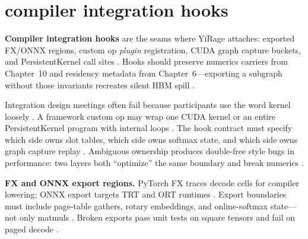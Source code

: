 \section{compiler integration hooks}
\label{sec:ch28_compiler_integration_hooks}

\textbf{Compiler integration hooks} are the seams where YiRage attaches: exported FX/ONNX regions, custom op \emph{plugin} registration, CUDA graph capture buckets, and PersistentKernel call sites \citep{yirage2026,chen2020compilerbasedhardw,nvidia2024cudagraphs,kwon2023vllm,patel2025llminference,taxbreak2026,memoryfloor2026,liu2024deepseekv3,dao2022flashattention,dao2023flashdecoding,semianalysis2024tma,dlbook,amd2024xdna,amd2024aie,nvidia2022hopper}. Hooks should preserve numerics carriers from Chapter~10 and residency metadata from Chapter~6---exporting a subgraph without those invariants recreates silent HBM spill \citep{dao2022flashattention,yirage2026,memoryfloor2026,taxbreak2026,patel2025llminference,chen2020compilerbasedhardw,dlbook,kwon2023vllm,liu2024deepseekv3,nvidia2024cudagraphs,semianalysis2024tma,amd2024aie,amd2024xdna,dao2023flashdecoding,nvidia2022hopper}.

Integration design meetings often fail because participants use the word kernel loosely \citep{yirage2026,chen2020compilerbasedhardw,patel2025llminference,kwon2023vllm,taxbreak2026,memoryfloor2026,dlbook,nvidia2024cudagraphs,dao2022flashattention,liu2024deepseekv3,semianalysis2024tma,amd2024xdna,amd2024aie,dao2023flashdecoding,nvidia2022hopper,dlbook}. A framework custom op may wrap one CUDA kernel or an entire PersistentKernel program with internal loops \citep{yirage2026,chen2020compilerbasedhardw,nvidia2024cudagraphs,kwon2023vllm,patel2025llminference,memoryfloor2026,taxbreak2026,dao2022flashattention,dlbook}. The hook contract must specify which side owns slot tables, which side owns softmax state, and which side owns graph capture replay \citep{dao2022flashattention,yirage2026,chen2020compilerbasedhardw,kwon2023vllm,patel2025llminference,nvidia2024cudagraphs,memoryfloor2026,taxbreak2026,dlbook}. Ambiguous ownership produces double-free style bugs in performance: two layers both ``optimize'' the same boundary and break numerics \citep{patel2025llminference,yirage2026,chen2020compilerbasedhardw,dao2022flashattention,memoryfloor2026,taxbreak2026,kwon2023vllm,dlbook}.

\textbf{FX and ONNX export regions.} PyTorch FX traces decode cells for compiler lowering; ONNX export targets TRT and ORT runtimes \citep{patel2025llminference,chen2020compilerbasedhardw,dlbook,nvidia2024cudagraphs,yirage2026}. Export boundaries must include page-table gathers, rotary embeddings, and online-softmax state---not only matmuls \citep{dao2022flashattention,dao2023flashdecoding,kwon2023vllm,yirage2026,memoryfloor2026,taxbreak2026,chen2020compilerbasedhardw,patel2025llminference,liu2024deepseekv3,nvidia2024cudagraphs,semianalysis2024tma,amd2024aie,amd2024xdna,dlbook}. Broken exports pass unit tests on square tensors and fail on paged decode \citep{kwon2023vllm,patel2025llminference,memoryfloor2026,yirage2026,chen2020compilerbasedhardw,taxbreak2026,dao2022flashattention}.

